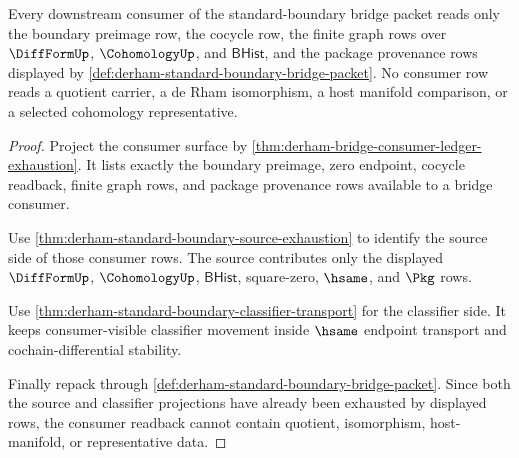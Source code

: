 \begin{theorem}
\label{thm:derham-standard-boundary-consumer-readback}
Every downstream consumer of the standard-boundary bridge packet reads only
the boundary preimage row, the cocycle row, the finite graph rows over
$\DiffFormUp$, $\CohomologyUp$, and $\mathsf{BHist}$, and the package
provenance rows displayed by \autoref{def:derham-standard-boundary-bridge-packet}.
No consumer row reads a quotient carrier, a de Rham isomorphism, a host
manifold comparison, or a selected cohomology representative.
\end{theorem}
\begin{proof}
Project the consumer surface by
\autoref{thm:derham-bridge-consumer-ledger-exhaustion}. It lists exactly the
boundary preimage, zero endpoint, cocycle readback, finite graph rows, and
package provenance rows available to a bridge consumer.

Use \autoref{thm:derham-standard-boundary-source-exhaustion} to identify the
source side of those consumer rows. The source contributes only the displayed
$\DiffFormUp$, $\CohomologyUp$, $\mathsf{BHist}$, square-zero, $\hsame$, and
$\Pkg$ rows.

Use \autoref{thm:derham-standard-boundary-classifier-transport} for the
classifier side. It keeps consumer-visible classifier movement inside
$\hsame$ endpoint transport and cochain-differential stability.

Finally repack through
\autoref{def:derham-standard-boundary-bridge-packet}. Since both the source
and classifier projections have already been exhausted by displayed rows, the
consumer readback cannot contain quotient, isomorphism, host-manifold, or
representative data.
\end{proof}

